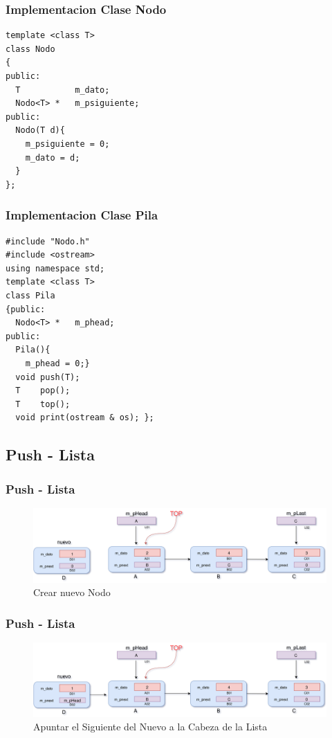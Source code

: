\documentclass{beamer}
\begin{document}
\begin{frame}[fragile]
\frametitle{Implementacion Clase Nodo}
\begin{verbatim}
template <class T>
class Nodo
{
public:
  T           m_dato;
  Nodo<T> *   m_psiguiente; 
public:
  Nodo(T d){
    m_psiguiente = 0;
    m_dato = d;
  }
};
\end{verbatim}
\end{frame}  


\begin{frame}[fragile]
\frametitle{Implementacion Clase Pila}
\begin{verbatim}
#include "Nodo.h"
#include <ostream>
using namespace std;
template <class T>
class Pila
{public:
  Nodo<T> *   m_phead;
public:
  Pila(){
    m_phead = 0;}
  void push(T);
  T    pop();
  T    top();
  void print(ostream & os); };
\end{verbatim}
\end{frame}  

\subsection{Push - Lista}
\begin{frame}
    \frametitle{Push - Lista}
    
    \begin{figure}
    \includegraphics[width =1 \textwidth]{images/push01}
    \caption{Crear nuevo Nodo}
    \end{figure}
       
\end{frame}

\begin{frame}
    \frametitle{Push - Lista}
    
    \begin{figure}
    \includegraphics[width =1 \textwidth]{images/push02}
    \caption{Apuntar el Siguiente del Nuevo a la Cabeza de la Lista}
    \end{figure}
       
\end{frame}
\end{document}

